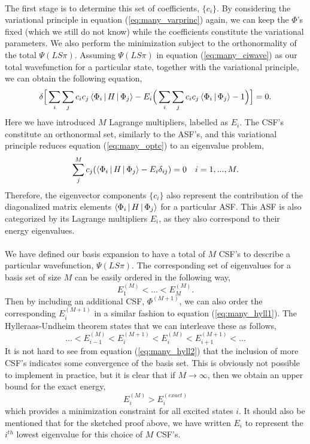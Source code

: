\\
The first stage is to determine this set of coefficients, $\{c_i\}$. By considering the variational principle in equation (\ref{eq:many_varprinc}) again, we can keep the $\Phi$'s fixed (which we still do not know) while the coefficients constitute the variational parameters. We also perform the minimization subject to the orthonormality of the total $\Psi(LS\pi)$. Assuming $\Psi(LS\pi)$ in equation (\ref{eq:many_ciwave}) as our total wavefunction for a particular state, together with the variational principle, we can obtain the following equation,
\begin{equation}\label{eq:many_optc}
\delta \Big[ \sum_i \sum_j c_ic_j\Braket{\Phi_i | H | \Phi_j} - E_i\Big(\sum_i \sum_j c_ic_j\Braket{\Phi_i | \Phi_j} -1\Big)\Big] = 0.
\end{equation}
Here we have introduced $M$ Lagrange multipliers, labelled as $E_i$. The CSF's constitute an orthonormal set, similarly to the ASF's, and this variational principle reduces equation (\ref{eq:many_optc}) to an eigenvalue problem,
\begin{equation}\label{eq:many_hij}
\sum_j^{M}c_j(\Braket{\Phi_i | H | \Phi_j} - E_i\delta_{ij}) = 0 ~~~ i=1,...,M.
\end{equation}
Therefore, the eigenvector components $\{c_i\}$ also represent the contribution of the diagonalized matrix elements $\Braket{\Phi_i | H | \Phi_j}$ for a particular ASF. This ASF is also categorized by its Lagrange multipliers $E_i$, as they also correspond to their energy eigenvalues.\\

\\
We have defined our basis expansion to have a total of $M$ CSF's to describe a particular wavefunction, $\Psi(LS\pi)$. The corresponding set of eigenvalues for a basis set of size $M$ can be easily ordered in the following way,
\begin{equation}\label{eq:many_hyll1}
E_1^{(M)} < ... < E_M^{(M)}.
\end{equation}
Then by including an additional CSF, $\Phi^{(M+1)}$, we can also order the corresponding $E_i^{(M+1)}$ in a similar fashion to equation (\ref{eq:many_hyll1}). The Hylleraas-Undheim theorem states that we can interleave these as follows,
\begin{equation}\label{eq:many_hyll2}
 ... < E_{i-1}^{(M)} < E_i^{(M+1)} < E_i^{(M)}  < E_{i+1}^{(M+1)} < ...
\end{equation}
It is not hard to see from equation (\ref{eq:many_hyll2}) that the inclusion of more CSF's indicates some convergence of the basis set. This is obviously not possible to implement in practice, but it is clear that if $M \rightarrow \infty $, then we obtain an upper bound for the exact energy,
\[
E_i^{(M)} > E_i^{(exact)}
\]
which provides a minimization constraint for all excited states $i$. It should also be mentioned that for the sketched proof above, we have written $E_i$ to represent the $i^{th}$ lowest eigenvalue for this choice of $M$ CSF's.

